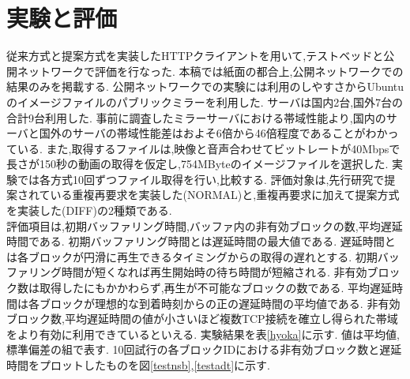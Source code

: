 \documentclass{ltjsarticle}
\begin{document}
\section{実験と評価}
\vspace{-2.75mm}
従来方式と提案方式を実装したHTTPクライアントを用いて,テストベッドと公開ネットワークで評価を行なった.
本稿では紙面の都合上,公開ネットワークでの結果のみを掲載する.
公開ネットワークでの実験には利用のしやすさからUbuntuのイメージファイルのパブリックミラーを利用した.
サーバは国内2台,国外7台の合計9台利用した.
事前に調査したミラーサーバにおける帯域性能より,国内のサーバと国外のサーバの帯域性能差はおよそ6倍から46倍程度であることがわかっている.
また,取得するファイルは,映像と音声合わせてビットレートが40Mbpsで長さが150秒の動画の取得を仮定し,754MByteのイメージファイルを選択した.
実験では各方式10回ずつファイル取得を行い,比較する.
評価対象は,先行研究で提案されている重複再要求を実装した(NORMAL)と,重複再要求に加えて提案方式を実装した(DIFF)の2種類である.
\\
\hspace{3.5mm}評価項目は,初期バッファリング時間,バッファ内の非有効ブロックの数,平均遅延時間である.
初期バッファリング時間とは遅延時間の最大値である.
遅延時間とは各ブロックが円滑に再生できるタイミングからの取得の遅れとする.
初期バッファリング時間が短くなれば再生開始時の待ち時間が短縮される.
非有効ブロック数は取得したにもかかわらず,再生が不可能なブロックの数である.
平均遅延時間は各ブロックが理想的な到着時刻からの正の遅延時間の平均値である.
非有効ブロック数,平均遅延時間の値が小さいほど複数TCP接続を確立し得られた帯域をより有効に利用できているといえる.
実験結果を表\ref{hyoka}に示す.
値は平均値,標準偏差の組で表す.
10回試行の各ブロックIDにおける非有効ブロック数と遅延時間をプロットしたものを図\ref{testnsb},\ref{testadt}に示す.
\vspace{-7.5mm}
\begin{table}[h]
	\begin{center}
		\caption{各評価項目の平均値，標準偏差}
		\vspace{-0.5mm}
		\label{hyoka}
	\end{center}
\end{table}
\end{document}
